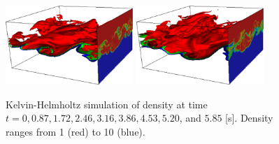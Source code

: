 \documentclass[final]{siamltex}
\begin{document}
\begin{figure}
\begin{center}
\includegraphics[width=1.9in]{KHLM_3d7}
\includegraphics[width=1.9in]{KHLM_3d8}
\caption{Kelvin-Helmholtz simulation of density at time
         $t=0, 0.87, 1.72, 2.46, 3.16, 3.86, 4.53, 5.20$, and $5.85$ [s].
         Density ranges from 1 (red) to 10 (blue).}\label{fig:KHLM_3D}
\end{center}
\end{figure}
\end{document}
